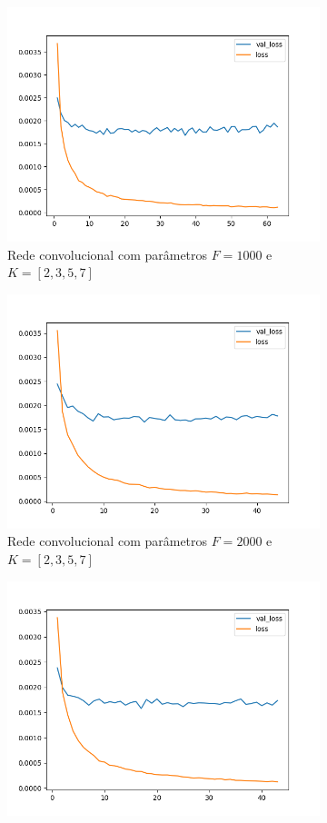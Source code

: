 \begin{figure}[H]
\begin{subfigure}{.5\textwidth}
  \centering
  \includegraphics[width=.8\linewidth]{figuras/ape-ajustes-hiper-parametros/cnn-1000.png}
  \caption{Rede convolucional com parâmetros $F = 1000$ e $K = [2,3,5,7]$}
  \label{fig:cnn-1000}
\end{subfigure}%
\begin{subfigure}{.5\textwidth}
  \centering
  \includegraphics[width=.8\linewidth]{figuras/ape-ajustes-hiper-parametros/cnn-2000.png}
  \caption{Rede convolucional com parâmetros $F = 2000$ e $K = [2, 3, 5, 7]$}
  \label{fig:cnn-2000}
\end{subfigure}
\begin{subfigure}{.5\textwidth}
  \centering
  \includegraphics[width=.8\linewidth]{figuras/ape-ajustes-hiper-parametros/cnn-4000.png}

\end{subfigure}
\end{figure}
